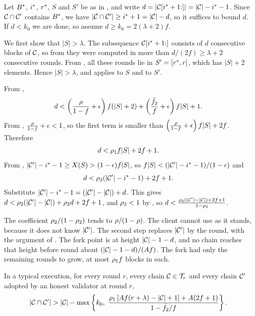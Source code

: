 \begin{proofof}{}
    Let $B^{*}$, $i^{*}$, $r^{*}$, $S$ and $S'$ be as in , and
    write $d=\lvert \mathcal{C}[i^{*}+1{:}]\rvert=\lvert \mathcal{C}\rvert-i^{*}-1$. Since $\mathcal{C}\cap\mathcal{C}'$
    contains $B^{*}$, we have $\lvert \mathcal{C}\cap\mathcal{C}'\rvert\ge i^{*}+1=\lvert \mathcal{C}\rvert-d$, so it
    suffices to bound $d$. If $d<k_0$ we are done, so assume
    $d\ge k_0=2(\lambda+2)f$.

    We first show that $|S|>\lambda$. The subsequence $\mathcal{C}[i^{*}+1{:}]$ consists
    of $d$ consecutive blocks of $\mathcal{C}$, so from  they were
    computed in more than $d/(2f)\ge\lambda+2$ consecutive rounds. From
    , all these rounds lie in $S'=[r^{*},r]$, which has $|S|+2$
    elements. Hence $|S|>\lambda$, and  applies to $S$ and to
    $S'$.

    From ,
    \[
        d < \left(\frac{\rho}{1-f}+\epsilon\right)f(|S|+2)
        + \left(\frac{\bar{f}_2}{f}+\epsilon\right)f|S| + 1 .
    \]
    From , $\frac{\rho}{1-f}+\epsilon<1$, so the first term is
    smaller than $\left(\frac{\rho}{1-f}+\epsilon\right)f|S|+2f$. Therefore
    \begin{equation}\label{eq.upper}
        d < \rho_1 f|S| + 2f + 1 .
    \end{equation}
    From ,
    $\lvert \mathcal{C}'\rvert-i^{*}-1\ge X(S)>(1-\epsilon)f|S|$, so
    $f|S|<(\lvert \mathcal{C}'\rvert-i^{*}-1)/(1-\epsilon)$ and
    \[
        d < \rho_2(\lvert \mathcal{C}'\rvert-i^{*}-1)+2f+1 .
    \]
    Substitute $\lvert \mathcal{C}'\rvert-i^{*}-1=(\lvert \mathcal{C}'\rvert-\lvert \mathcal{C}\rvert)+d$. This gives
    $d<\rho_2(\lvert \mathcal{C}'\rvert-\lvert \mathcal{C}\rvert)+\rho_2 d+2f+1$, and $\rho_2<1$ by
    , so $d<\frac{\rho_2(\lvert \mathcal{C}'\rvert-\lvert \mathcal{C}\rvert)+2f+1}{1-\rho_2}$.
\end{proofof}

The coefficient $\rho_2/(1-\rho_2)$ tends to $\rho/(1-\rho)$.
The client cannot
use  as it stands, because it does not know $\lvert \mathcal{C}'\rvert$. The
second step replaces $\lvert \mathcal{C}'\rvert$ by the round, with the argument of
. The fork point is at height $\lvert \mathcal{C}\rvert-1-d$, and no
chain reaches that height before round about $(\lvert \mathcal{C}\rvert-1-d)/(A f)$. The
fork had only the remaining rounds to grow, at most $\rho_1 f$ blocks in
each.

\begin{lemma}\label{lem.round}
    In a typical execution, for every round $r$, every chain $\mathcal{C}\in\mathcal{T}_r$ and
    every chain $\mathcal{C}'$ adopted by an honest validator at round $r$,
    \[
        \lvert \mathcal{C}\cap\mathcal{C}'\rvert > \lvert \mathcal{C}\rvert - \max\left\{k_0,\
        \frac{\rho_1\left[A f(r+\lambda)-\lvert \mathcal{C}\rvert+1\right]+A(2f+1)}{1-\bar{f}_2/f}\right\}.
    \]
\end{lemma}


